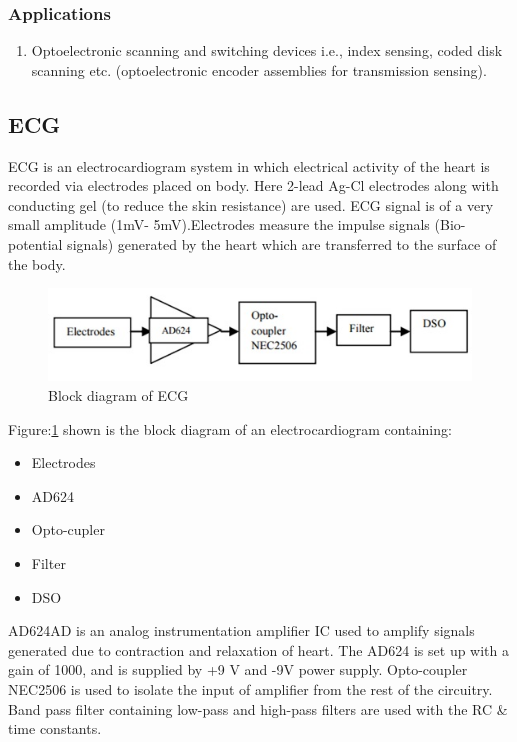 \documentclass[12pt,a4paper,oneside,openright]{report}
\begin{document}
\subsubsection{Applications}
\begin{enumerate}
 \item Optoelectronic scanning and switching devices i.e., index sensing, coded disk scanning etc. (optoelectronic encoder assemblies for transmission sensing).
\end{enumerate}


\subsection{ECG}
ECG is an electrocardiogram system in which electrical activity of the heart is recorded via electrodes placed on body. Here 2-lead Ag-Cl electrodes along with conducting gel (to reduce the skin resistance) are used. ECG signal is of a very small amplitude (1mV- 5mV).Electrodes measure the impulse signals (Bio-potential signals) generated by the heart which are transferred to the surface of the body.
\begin{figure}[!h]
 \centering
 \includegraphics[width = \textwidth]{Figures/10.jpg}
 \caption{Block diagram of ECG}
 \label{becg}
\end{figure}
Figure:\ref{becg} shown is the block diagram of an electrocardiogram containing:
\begin{itemize}
 \item Electrodes
 \item AD624
 \item Opto-cupler
 \item Filter
 \item DSO
\end{itemize}

AD624AD is an analog instrumentation amplifier IC used to amplify signals generated due to contraction and relaxation of heart. The AD624 is set up with a gain of 1000, and is supplied by +9 V and -9V power supply. Opto-coupler NEC2506 is used to isolate the input of amplifier from the rest of the circuitry. Band pass filter containing low-pass and high-pass filters are used with the RC \& time constants. 
\end{document}
